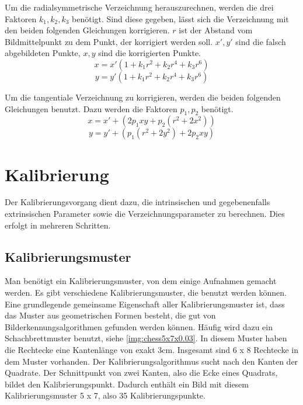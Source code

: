 Um die radialsymmetrische Verzeichnung herauszurechnen, werden die drei Faktoren $k_1, k_2, k_3$ benötigt. Sind diese gegeben, lässt sich die Verzeichnung mit den beiden folgenden Gleichungen korrigieren. $r$ ist der Abstand vom Bildmittelpunkt zu dem Punkt, der korrigiert werden soll. $x', y'$ sind die falsch abgebildeten Punkte, $x,y$ sind die korrigierten Punkte.
\begin{equation}
	x = x'(1 + k_1 r^2 + k_2 r^4 + k_3 r^6)
\end{equation}
\begin{equation}
	y = y'(1 + k_1 r^2 + k_2 r^4 + k_3 r^6)
\end{equation}

Um die tangentiale Verzeichnung zu korrigieren, werden die beiden folgenden Gleichungen benutzt. Dazu werden die Faktoren $p_1, p_2$ benötigt.
\begin{equation}
	x = x' + (2 p_1 xy + p_2 (r^2 + 2 x^2))
\end{equation}
\begin{equation}
	y = y' + (p_1(r^2 + 2 y^2) + 2p_2 xy)
\end{equation}

\section{Kalibrierung} %
\label{sec:kalibrierung}
Der Kalibrierungsvorgang dient dazu, die intrinsischen und gegebenenfalls extrinsischen Parameter sowie die Verzeichnungsparameter zu berechnen. Dies erfolgt in mehreren Schritten.

\subsection{Kalibrierungsmuster} %
\label{sub:kalibrierungsmuster}
Man benötigt ein Kalibrierungsmuster, von dem einige Aufnahmen gemacht werden. Es gibt verschiedene Kalibrierungsmuster, die benutzt werden können. Eine grundlegende gemeinsame Eigenschaft aller Kalibrierungsmuster ist, dass das Muster aus geometrischen Formen besteht, die gut von Bilderkennungsalgorithmen gefunden werden können. Häufig wird dazu ein Schachbrettmuster benutzt, siehe \autoref{img:chess5x7x0.03}. In diesem Muster haben die Rechtecke eine Kantenlänge von exakt 3cm. Insgesamt sind 6 x 8 Rechtecke in dem Muster vorhanden. Der Kalibrierungsalgorithmus sucht nach den Kanten der Quadrate. Der Schnittpunkt von zwei Kanten, also die Ecke eines Quadrats, bildet den Kalibrierungspunkt. Dadurch enthält ein Bild mit diesem Kalibrierungsmuster 5 x 7, also 35 Kalibrierungspunkte.

